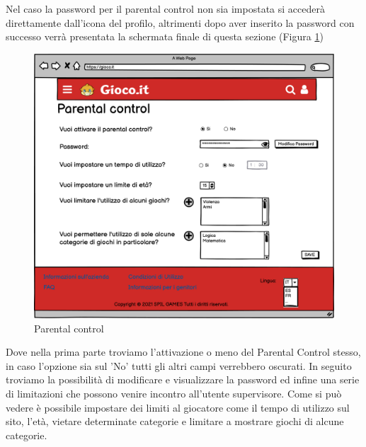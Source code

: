 \documentclass[../Report.tex]{subfiles}
\begin{document}
    Nel caso la password per il parental control non sia impostata si accederà direttamente dall'icona del profilo, altrimenti dopo aver inserito la password con successo verrà presentata la schermata finale di questa sezione (Figura \ref{fig: parental control})
        \begin{figure}[H]
            \centering
            \includegraphics[width=\textwidth]{WParentalControl.png}
            \caption{Parental control}
            \label{fig: parental control}
        \end{figure}
        Dove nella prima parte troviamo l'attivazione o meno del Parental Control stesso, in caso l'opzione sia sul 'No' tutti gli altri campi verrebbero oscurati.
        In seguito troviamo la possibilità di modificare e visualizzare la password ed infine una serie di limitazioni che possono venire incontro all'utente supervisore.
        Come si può vedere è possibile impostare dei limiti al giocatore come il tempo di utilizzo sul sito, l'età, vietare determinate categorie e limitare a mostrare giochi di alcune categorie.\\
\end{document}
